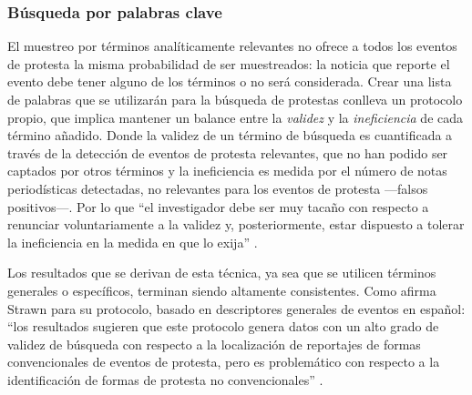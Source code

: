 \documentclass[letterpaper, 11pt]{book}
\theoremstyle{definition}
\theoremstyle{remark}
\begin{document}
\subsubsection{Búsqueda por palabras clave}
\label{sec:sesgoMuestreo_keywords}

El muestreo por términos analíticamente relevantes no ofrece a todos los eventos de protesta la misma probabilidad de ser muestreados: la noticia que reporte el evento debe tener alguno de los términos o no será considerada. 
Crear una lista de palabras que se utilizarán para la búsqueda de protestas conlleva un protocolo propio, que implica mantener un balance entre la \emph{validez} y la \emph{ineficiencia} de cada término añadido. 
Donde la validez de un término de búsqueda es cuantificada a través de la detección de eventos de protesta relevantes, que no han podido ser captados por otros términos y la ineficiencia es medida por el número de notas periodísticas detectadas, no relevantes para los eventos de protesta ---falsos positivos---. 
Por lo que ``el investigador debe ser muy tacaño con respecto a renunciar voluntariamente a la validez y, posteriormente, estar dispuesto a tolerar la ineficiencia en la medida en que lo exija'' \citep[78]{2010_Strawn_keywordSearch}.


Los resultados que se derivan de esta técnica, ya sea que se utilicen términos generales o específicos, terminan siendo altamente consistentes. Como afirma Strawn para su protocolo, basado en descriptores generales de eventos en español: 
``los resultados sugieren que este protocolo genera datos con un alto grado de validez de búsqueda con respecto a la localización de reportajes de formas convencionales de eventos de protesta, pero es problemático con respecto a la identificación de formas de protesta no convencionales'' \citep[69]{2010_Strawn_keywordSearch}. 
\end{document}
